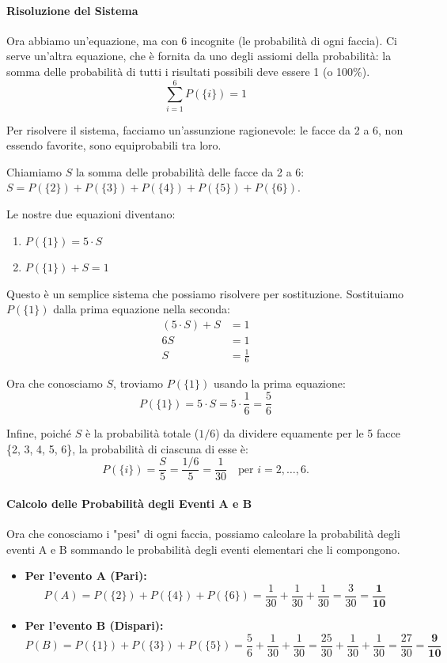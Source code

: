 \begin{esempio}
\paragraph{Risoluzione del Sistema}
Ora abbiamo un'equazione, ma con 6 incognite (le probabilità di ogni faccia). Ci serve un'altra equazione, che è fornita da uno degli assiomi della probabilità: la somma delle probabilità di tutti i risultati possibili deve essere 1 (o 100\%).
\[ \sum_{i=1}^{6} P(\{i\}) = 1 \]

Per risolvere il sistema, facciamo un'assunzione ragionevole: le facce da 2 a 6, non essendo favorite, sono equiprobabili tra loro.

Chiamiamo \(S\) la somma delle probabilità delle facce da 2 a 6: \( S = P(\{2\}) + P(\{3\}) + P(\{4\}) + P(\{5\}) + P(\{6\}) \).

Le nostre due equazioni diventano:
\begin{enumerate}
    \item \( P(\{1\}) = 5 \cdot S \)
    \item \( P(\{1\}) + S = 1 \)
\end{enumerate}

Questo è un semplice sistema che possiamo risolvere per sostituzione. Sostituiamo \(P(\{1\})\) dalla prima equazione nella seconda:
\begin{align*}
(5 \cdot S) + S &= 1 \\
6S &= 1 \\
S &= \frac{1}{6}
\end{align*}

Ora che conosciamo \(S\), troviamo \(P(\{1\})\) usando la prima equazione:
\[ P(\{1\}) = 5 \cdot S = 5 \cdot \frac{1}{6} = \frac{5}{6} \]

Infine, poiché \(S\) è la probabilità totale (\(1/6\)) da dividere equamente per le 5 facce \{2, 3, 4, 5, 6\}, la probabilità di ciascuna di esse è:
\[ P(\{i\}) = \frac{S}{5} = \frac{1/6}{5} = \frac{1}{30} \quad \text{per } i = 2, \dots, 6. \]

\paragraph{Calcolo delle Probabilità degli Eventi A e B}
Ora che conosciamo i "pesi" di ogni faccia, possiamo calcolare la probabilità degli eventi A e B sommando le probabilità degli eventi elementari che li compongono.

\begin{itemize}
    \item \textbf{Per l'evento A (Pari):}
    \[
    P(A) = P(\{2\}) + P(\{4\}) + P(\{6\}) = \frac{1}{30} + \frac{1}{30} + \frac{1}{30} = \frac{3}{30} = \mathbf{\frac{1}{10}}
    \]
    
    \item \textbf{Per l'evento B (Dispari):}
    \[
    P(B) = P(\{1\}) + P(\{3\}) + P(\{5\}) = \frac{5}{6} + \frac{1}{30} + \frac{1}{30} = \frac{25}{30} + \frac{1}{30} + \frac{1}{30} = \frac{27}{30} = \mathbf{\frac{9}{10}}
    \]
\end{itemize}
\end{esempio}

\clearpage
